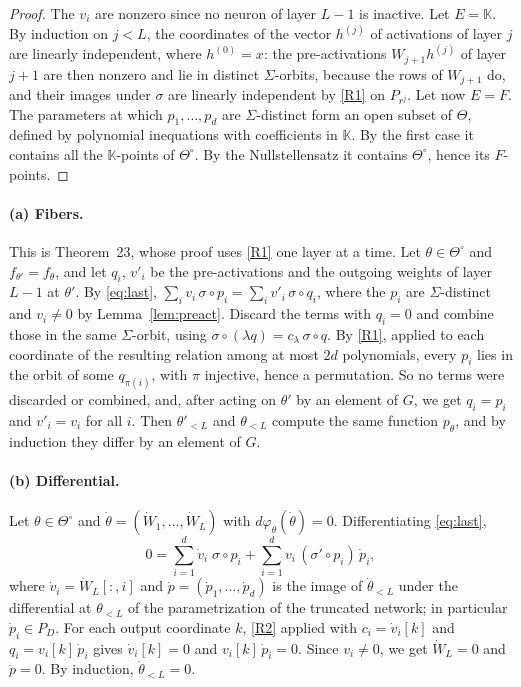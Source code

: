 \documentclass[11pt]{article}
\theoremstyle{definition}
\theoremstyle{remark}
\newcommand{\K}{\mathbb{K}}
\newcommand{\To}{\Theta^{\circ}}
\begin{document}
\begin{proof}
The $v_i$ are nonzero since no neuron of layer $L-1$ is inactive. Let $E=\K$. By induction on $j<L$, the coordinates of the vector $h^{(j)}$ of activations of layer $j$ are linearly independent, where $h^{(0)}=x$: the pre-activations $W_{j+1}h^{(j)}$ of layer $j+1$ are then nonzero and lie in distinct $\Sigma$-orbits, because the rows of $W_{j+1}$ do, and their images under $\sigma$ are linearly independent by \ref{R1} on $P_{r^j}$. Let now $E=F$. The parameters at which $p_1,\dots,p_d$ are $\Sigma$-distinct form an open subset of $\Theta$, defined by polynomial inequations with coefficients in $\K$. By the first case it contains all the $\K$-points of $\To$. By the Nullstellensatz it contains $\To$, hence its $F$-points.
\end{proof}

\paragraph{(a) Fibers.} This is Theorem~23, whose proof uses \ref{R1} one layer at a time. Let $\theta\in\To$ and $f_{\theta'}=f_\theta$, and let $q_i$, $v'_i$ be the pre-activations and the outgoing weights of layer $L-1$ at $\theta'$. By \eqref{eq:last}, $\sum_iv_i\,\sigma\circ p_i=\sum_iv'_i\,\sigma\circ q_i$, where the $p_i$ are $\Sigma$-distinct and $v_i\ne0$ by Lemma~\ref{lem:preact}. Discard the terms with $q_i=0$ and combine those in the same $\Sigma$-orbit, using $\sigma\circ(\lambda q)=c_\lambda\,\sigma\circ q$. By \ref{R1}, applied to each coordinate of the resulting relation among at most $2d$ polynomials, every $p_i$ lies in the orbit of some $q_{\pi(i)}$, with $\pi$ injective, hence a permutation. So no terms were discarded or combined, and, after acting on $\theta'$ by an element of $G$, we get $q_i=p_i$ and $v'_i=v_i$ for all $i$. Then $\theta'_{<L}$ and $\theta_{<L}$ compute the same function $p_\theta$, and by induction they differ by an element of $G$.

\paragraph{(b) Differential.} Let $\theta\in\To$ and $\dot\theta=(\dot W_1,\dots,\dot W_L)$ with $d\varphi_\theta(\dot\theta)=0$. Differentiating \eqref{eq:last},
\[
0=\sum_{i=1}^d\dot v_i\;\sigma\circ p_i+\sum_{i=1}^dv_i\,(\sigma'\circ p_i)\,\dot p_i,
\]
where $\dot v_i=\dot W_L[:,i]$ and $\dot p=(\dot p_1,\dots,\dot p_d)$ is the image of $\dot\theta_{<L}$ under the differential at $\theta_{<L}$ of the parametrization of the truncated network; in particular $\dot p_i\in P_D$. For each output coordinate $k$, \ref{R2} applied with $c_i=\dot v_i[k]$ and $q_i=v_i[k]\,\dot p_i$ gives $\dot v_i[k]=0$ and $v_i[k]\,\dot p_i=0$. Since $v_i\ne0$, we get $\dot W_L=0$ and $\dot p=0$. By induction, $\dot\theta_{<L}=0$.
\end{document}
